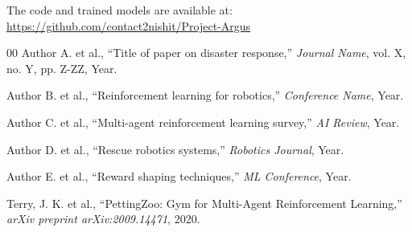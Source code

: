 \documentclass[conference]{IEEEtran}
\begin{document}
The code and trained models are available at: \url{https://github.com/contact2nishit/Project-Argus}

\begin{thebibliography}{00}
 Author A. et al., ``Title of paper on disaster response,'' \textit{Journal Name}, vol. X, no. Y, pp. Z-ZZ, Year.

 Author B. et al., ``Reinforcement learning for robotics,'' \textit{Conference Name}, Year.

 Author C. et al., ``Multi-agent reinforcement learning survey,'' \textit{AI Review}, Year.

 Author D. et al., ``Rescue robotics systems,'' \textit{Robotics Journal}, Year.

 Author E. et al., ``Reward shaping techniques,'' \textit{ML Conference}, Year.

 Terry, J. K. et al., ``PettingZoo: Gym for Multi-Agent Reinforcement Learning,'' \textit{arXiv preprint arXiv:2009.14471}, 2020.

\end{thebibliography}
\end{document}
